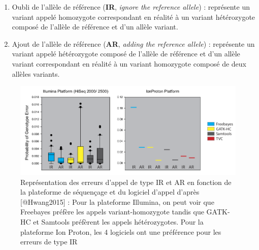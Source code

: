 \documentclass[12pt,twoside]{reedthesis}
\providecommand{\tightlist}{%
  \setlength{\itemsep}{0pt}\setlength{\parskip}{0pt}}
\theoremstyle{definition}
\theoremstyle{definition}
\theoremstyle{remark}
\begin{document}
  \begin{enumerate}
  \def\labelenumi{\arabic{enumi}.}
  \tightlist
  \item
    Oubli de l'allèle de référence (\textbf{IR}, \emph{ignore the
    reference allele}) : représente un variant appelé homozygote
    correspondant en réalité à un variant hétérozygote composé de l'allèle
    de référence et d'un allèle variant.\\
  \item
    Ajout de l'allèle de référence (\textbf{AR}, \emph{adding the
    reference allele}) : représente un variant appelé hétérozygote composé
    de l'allèle de référence et d'un allèle variant correspondant en
    réalité à un variant homozygote composé de deux allèles variants.\\
  \end{enumerate}
  
  \begin{figure}
  
  {\centering \includegraphics[scale=.50]{figure/snp_error_type} 
  
  }
  
  \caption[Représentation des erreurs d'appel de type IR et AR en fonction de la plateforme de séquençage et du logiciel d'appel]{Représentation des erreurs d'appel de type IR et AR en fonction de la plateforme de séquençage et du logiciel d'appel d'après [@Hwang2015] : Pour la plateforme Illumina, on peut voir que Freebayes préfère les appels variant-homozygote tandis que GATK-HC et Samtools préfèrent les appels hétérozygotes. Pour la plateforme Ion Proton, les 4 logiciels ont une préférence pour les erreurs de type IR}\label{fig:snperror}
  \end{figure}
  
\end{document}
